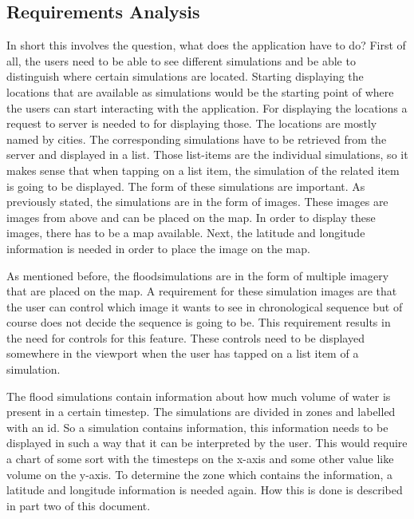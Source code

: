 \subsection{Requirements Analysis}
\label{sec:requirements}
In short this involves the question, what does the application have to do? First of all, the users need to be able to see different simulations and be able to distinguish where certain simulations are located. Starting displaying the locations that are available as simulations would be the starting point of where the users can start interacting with the application. For displaying the locations a request to server is needed to for displaying those. 
The locations are mostly named by cities. The corresponding simulations have to be retrieved from the server and displayed in a list. Those list-items are the individual simulations, so it makes sense that when tapping on a list item, the simulation of the related item is going to be displayed. The form of these simulations are important. As previously stated, the simulations are in the form of images. These images are images from above and can be placed on the map. In order to display these images, there has to be a map available. Next, the latitude and longitude information is needed in order to place the image on the map.

As mentioned before, the floodsimulations are in the form of multiple imagery that are placed on the map. A requirement for these simulation images are that the user can control which image it wants to see in chronological sequence but of course does not decide the sequence is going to be. This requirement results in the need for controls for this feature. These controls need to be displayed somewhere in the viewport when the user has tapped on a list item of a simulation.

The flood simulations contain information about how much volume of water is present in a certain timestep. The simulations are divided in zones and labelled with an id. So a simulation contains information, this information needs to be displayed in such a way that it can be interpreted by the user. This would require a chart of some sort with the timesteps on the x-axis and some other value like volume on the y-axis. To determine the zone which contains the information, a latitude and longitude information is needed again. How this is done is described in part two of this document.

